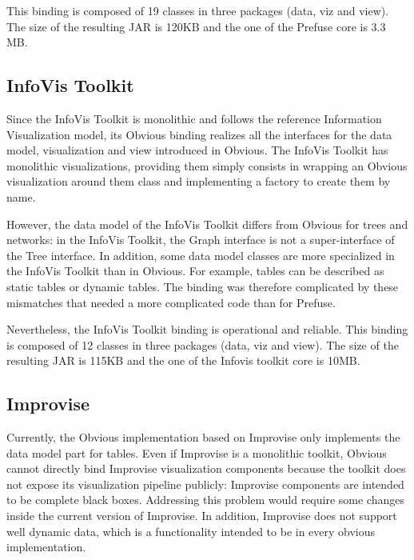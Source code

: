 
This binding is composed of 19 classes in three packages (data, viz and
view). The size of the resulting JAR is 120KB and the one of the
Prefuse core is 3.3 MB.

\subsection{InfoVis Toolkit}

Since the InfoVis Toolkit is monolithic and follows the reference
Information Visualization model, its Obvious binding realizes all the
interfaces for the data model, visualization and view introduced in
Obvious. The InfoVis Toolkit has monolithic visualizations, providing
them simply consists in wrapping an Obvious visualization around them
class and implementing a factory to create them by name.

However, the data model of the InfoVis Toolkit differs from Obvious
for trees and networks: in the InfoVis Toolkit, the Graph interface is
not a super-interface of the Tree interface.  In addition, some data
model classes are more specialized in the InfoVis Toolkit than in
Obvious.  For example, tables can be described as static tables or
dynamic tables.  The binding was therefore complicated by these
mismatches that needed a more complicated code than for Prefuse.

Nevertheless, the InfoVis Toolkit binding is operational and
reliable. This binding is composed of 12 classes in three packages
(data, viz and view). The size of the resulting JAR is 115KB and the
one of the Infovis toolkit core is 10MB.

\subsection{Improvise}

Currently, the Obvious implementation based on Improvise only
implements the data model part for tables.  Even if Improvise is a
monolithic toolkit, Obvious cannot directly bind Improvise
visualization components because the toolkit does not expose its
visualization pipeline publicly: Improvise components are intended to
be complete black boxes.  Addressing this problem would require some
changes inside the current version of Improvise. In addition,
Improvise does not support well dynamic data, which is a functionality
intended to be in every obvious implementation.

